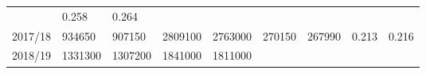 \documentclass[
  spanish,
]{article}
\begin{document}
\begin{longtable}[]{@{}lllllllll@{}}
\begin{minipage}[t]{0.09\columnwidth}
\end{minipage} & \begin{minipage}[t]{0.08\columnwidth}\raggedright
0.258\strut
\end{minipage} & \begin{minipage}[t]{0.09\columnwidth}\raggedright
0.264\strut
\end{minipage}\tabularnewline
\begin{minipage}[t]{0.06\columnwidth}\raggedright
2017/18\strut
\end{minipage} & \begin{minipage}[t]{0.09\columnwidth}\raggedright
934650\strut
\end{minipage} & \begin{minipage}[t]{0.10\columnwidth}\raggedright
907150\strut
\end{minipage} & \begin{minipage}[t]{0.09\columnwidth}\raggedright
2809100\strut
\end{minipage} & \begin{minipage}[t]{0.10\columnwidth}\raggedright
2763000\strut
\end{minipage} & \begin{minipage}[t]{0.08\columnwidth}\raggedright
270150\strut
\end{minipage} & \begin{minipage}[t]{0.09\columnwidth}\raggedright
267990\strut
\end{minipage} & \begin{minipage}[t]{0.08\columnwidth}\raggedright
0.213\strut
\end{minipage} & \begin{minipage}[t]{0.09\columnwidth}\raggedright
0.216\strut
\end{minipage}\tabularnewline
\begin{minipage}[t]{0.06\columnwidth}\raggedright
2018/19\strut
\end{minipage} & \begin{minipage}[t]{0.09\columnwidth}\raggedright
1331300\strut
\end{minipage} & \begin{minipage}[t]{0.10\columnwidth}\raggedright
1307200\strut
\end{minipage} & \begin{minipage}[t]{0.09\columnwidth}\raggedright
1841000\strut
\end{minipage} & \begin{minipage}[t]{0.10\columnwidth}\raggedright
1811000\strut
\end{minipage} & \begin{minipage}[t]{0.08\columnwidth}\raggedright

\end{minipage}
\end{longtable}
\end{document}
